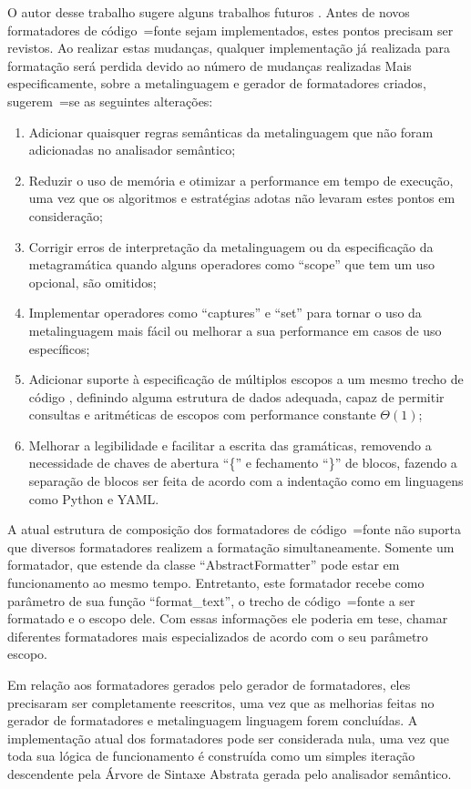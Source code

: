 O autor desse trabalho sugere alguns trabalhos futuros .
Antes de novos formatadores de código~=fonte sejam implementados,
estes pontos precisam ser revistos.
Ao realizar estas mudanças,
qualquer implementação já realizada para formatação será perdida devido ao número de mudanças realizadas Mais especificamente,
sobre a metalinguagem e
gerador de formatadores criados,
sugerem~=se as seguintes alterações:
\begin{enumerate}
\item Adicionar quaisquer regras semânticas da metalinguagem que não foram adicionadas no analisador semântico;
\item Reduzir o uso de memória e
otimizar a performance em tempo de execução,
uma vez que os algoritmos e
estratégias adotas não levaram estes pontos em consideração;
\item Corrigir erros de interpretação da metalinguagem ou
da especificação da metagramática quando alguns operadores como ``scope'' que tem um uso opcional,
são omitidos;
\item Implementar operadores como ``captures'' e
``set'' para tornar o uso da metalinguagem mais fácil ou
melhorar a sua performance em casos de uso específicos;
\item Adicionar suporte à especificação de múltiplos escopos a um mesmo trecho de código \cite{vsCodeSyntaxHighlighthing},
definindo alguma estrutura de dados adequada,
capaz de permitir consultas e
aritméticas de escopos \cite{textMateScopeExclusion} com performance constante $\Theta(1)$;
\item Melhorar a legibilidade e
facilitar a escrita das gramáticas,
removendo a necessidade de chaves de abertura ``\{'' e
fechamento ``\}'' de blocos,
fazendo a separação de blocos ser feita de acordo com a indentação como em linguagens como Python e
YAML.
\end{enumerate}%

A atual estrutura de composição dos formatadores de código~=fonte não suporta que diversos formatadores realizem a formatação simultaneamente.
Somente um formatador,
que estende da classe ``AbstractFormatter'' pode estar em funcionamento ao mesmo tempo.
Entretanto,
este formatador recebe como parâmetro de sua função ``format\_text'',
o trecho de código~=fonte a ser formatado e
o escopo dele.
Com essas informações ele poderia em tese,
chamar diferentes formatadores mais especializados de acordo com o seu parâmetro escopo.

Em relação aos formatadores gerados pelo gerador de formatadores,
eles precisaram ser completamente reescritos,
uma vez que as melhorias feitas no gerador de formatadores e
metalinguagem linguagem forem concluídas.
A implementação atual dos formatadores pode ser considerada nula,
uma vez que toda sua lógica de funcionamento é construída como um simples iteração descendente pela Árvore de Sintaxe Abstrata gerada pelo analisador semântico.

